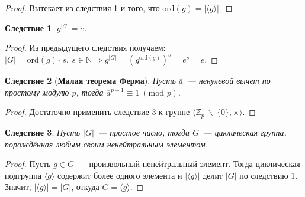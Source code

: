 \documentclass[a4paper, 14pt]{extarticle}
\newcommand{\integers}{\mathbb{Z}}
\newcommand{\naturals}{\mathbb{N}}
\newcommand{\ord}{\mathrm{ord}}
\renewcommand{\mod}{\mathrm{mod} \,}
\theoremstyle{definition}
\theoremstyle{plain}
\numberwithin{theorem}{section}
\numberwithin{definition}{section}
\numberwithin{statement}{section}
\numberwithin{lemma}{section}
\newtheorem{consequence}{Следствие}
\numberwithin{consequence}{section}
\begin{document}
		\begin{proof}
			Вытекает из следствия 1 и того, что $\ord(g) = |\langle g \rangle|$.
		\end{proof}
		\begin{consequence}
			$g^{|G|} = e$.
		\end{consequence}
		\begin{proof}
			Из предыдущего следствия получаем: ${|G| = \ord(g) \cdot s, \ s \in \naturals} \Longrightarrow g^{|G|} = (g^{\ord(g)})^s = e^s = e.$
		\end{proof}
		\begin{consequence}[\textbf{Малая теорема Ферма}]
			Пусть $\overline{a}$~--- ненулевой вычет по простому модулю $p$, тогда $\overline{a}^{p-1} \equiv 1 \ (\mod \, p).$
		\end{consequence}
		\begin{proof}
			Достаточно применить следствие 3 к группе $\langle \integers_p \ \backslash \ \{0\}, \times \rangle.$
		\end{proof}
		\begin{consequence}
			Пусть $|G|$~--- простое число, тогда $G$~--- циклическая группа, порождённая любым своим ненейтральным элементом.
		\end{consequence}
		\begin{proof}
			Пусть $g \in G$~--- произвольный ненейтральный элемент. Тогда циклическая подгруппа $\langle g \rangle$ содержит более одного элемента и $|\langle g \rangle|$ делит $|G|$ по следствию 1. Значит, $|\langle g \rangle| = |G|$, откуда $G = \langle g \rangle$. 
		\end{proof}
		\newpage
\end{document}
